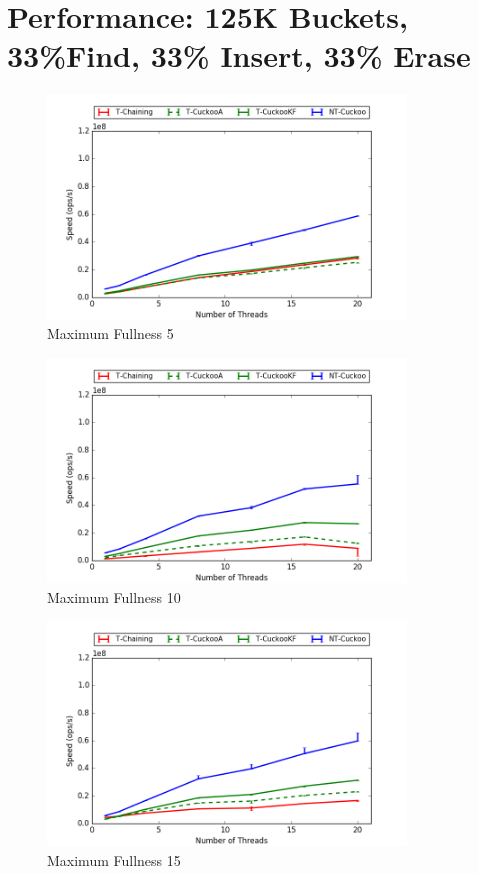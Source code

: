 \section{Performance: 125K Buckets, 33\%Find, 33\% Insert, 33\% Erase}
\begin{figure}[H]
    \centering
	\includegraphics[width=0.85\textwidth]{maps/5HM125K:F34,I33,E33.png} 
        \caption*{Maximum Fullness 5}
\end{figure}
\begin{figure}[H]
    \centering
	\includegraphics[width=0.85\textwidth]{maps/10HM125K:F34,I33,E33.png} 
        \caption*{Maximum Fullness 10}
\end{figure}
\begin{figure}[H]
    \centering
	\includegraphics[width=0.85\textwidth]{maps/15HM125K:F34,I33,E33.png} 
        \caption*{Maximum Fullness 15}
\end{figure}


